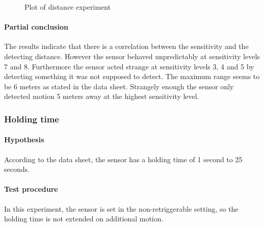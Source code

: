 \begin{figure}[htbp]
\centering
{}
\caption[Distance experiment]{Plot of distance experiment}\label{fig:pir_distance}
\end{figure}

\paragraph{Partial conclusion}
The results indicate that there is a correlation between the sensitivity and the detecting distance.
However the sensor behaved unpredictably at sensitivity levels 7 and 8.
Furthermore the sensor acted strange at sensitivity levels 3, 4 and 5 by detecting something it was not supposed to detect.
The maximum range seems to be 6 meters as stated in the data sheet.
Strangely enough the sensor only detected motion 5 meters away at the highest
sensitivity level.

\subsubsection{Holding time}

\paragraph{Hypothesis}

According to the data sheet, the sensor has a holding time of 1 second to 25 seconds.

\paragraph{Test procedure}

In this experiment, the sensor is set in the non-retriggerable setting, so the holding time is not extended on additional motion.

